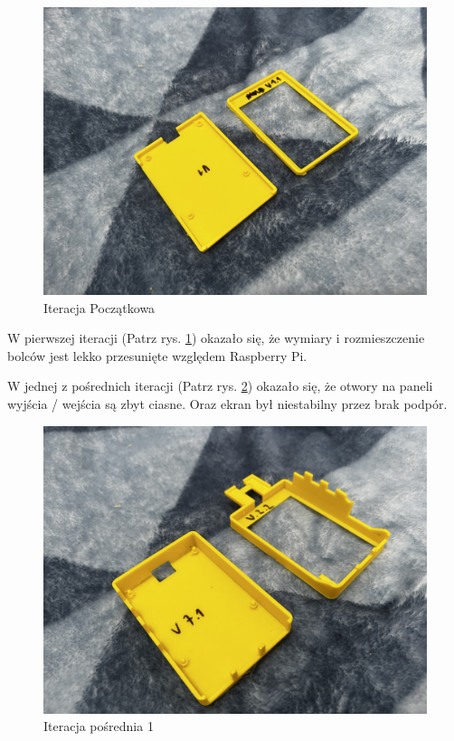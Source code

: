 \documentclass[a4paper,12pt,reqno]{article}
\begin{document}
\begin{figure}[H]%
\centering
\includegraphics[width=0.8\columnwidth]{imgs/print_0.jpg}
\caption{Iteracja Początkowa \label{PDCA_00}}
\quad
\end{figure}

W pierwszej iteracji (Patrz rys. \ref{PDCA_00}) okazało się, że wymiary i rozmieszczenie bolców jest lekko przesunięte względem Raspberry Pi.

\newpage
W jednej z pośrednich iteracji (Patrz rys. \ref{PDCA_01}) \textcolor{edited}{okazało się, że otwory na paneli wyjścia / wejścia są zbyt ciasne. Oraz ekran był niestabilny przez brak podpór}.

\begin{figure}[H]%
\centering
\includegraphics[width=0.8\columnwidth]{imgs/print_1.jpg}
\caption{Iteracja pośrednia 1 \label{PDCA_01}}
\quad
\end{figure}
\end{document}
